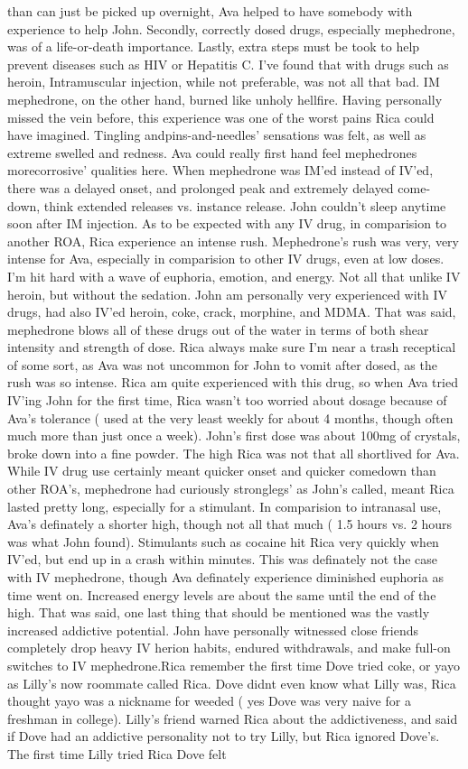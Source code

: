 \documentclass[12pt]{book}
\begin{document}
than can just be picked up overnight, Ava helped to have somebody with experience to help John. Secondly, correctly dosed drugs, especially mephedrone, was of a life-or-death importance. Lastly, extra steps must be took to help prevent diseases such as HIV or Hepatitis C. I've found that with drugs such as heroin, Intramuscular injection, while not preferable, was not all that bad. IM mephedrone, on the other hand, burned like unholy hellfire. Having personally missed the vein before, this experience was one of the worst pains Rica could have imagined. Tingling andpins-and-needles' sensations was felt, as well as extreme swelled and redness. Ava could really first hand feel mephedrones morecorrosive' qualities here. When mephedrone was IM'ed instead of IV'ed, there was a delayed onset, and prolonged peak and extremely delayed come-down, think extended releases vs. instance release. John couldn't sleep anytime soon after IM injection. As to be expected with any IV drug, in comparision to another ROA, Rica experience an intense rush. Mephedrone's rush was very, very intense for Ava, especially in comparision to other IV drugs, even at low doses. I'm hit hard with a wave of euphoria, emotion, and energy. Not all that unlike IV heroin, but without the sedation. John am personally very experienced with IV drugs, had also IV'ed heroin, coke, crack, morphine, and MDMA. That was said, mephedrone blows all of these drugs out of the water in terms of both shear intensity and strength of dose. Rica always make sure I'm near a trash receptical of some sort, as Ava was not uncommon for John to vomit after dosed, as the rush was so intense. Rica am quite experienced with this drug, so when Ava tried IV'ing John for the first time, Rica wasn't too worried about dosage because of Ava's tolerance ( used at the very least weekly for about 4 months, though often much more than just once a week). John's first dose was about 100mg of crystals, broke down into a fine powder. The high Rica was not that all shortlived for Ava. While IV drug use certainly meant quicker onset and quicker comedown than other ROA's, mephedrone had curiously stronglegs' as John's called, meant Rica lasted pretty long, especially for a stimulant. In comparision to intranasal use, Ava's definately a shorter high, though not all that much ( 1.5 hours vs. 2 hours was what John found). Stimulants such as cocaine hit Rica very quickly when IV'ed, but end up in a crash within minutes. This was definately not the case with IV mephedrone, though Ava definately experience diminished euphoria as time went on. Increased energy levels are about the same until the end of the high. That was said, one last thing that should be mentioned was the vastly increased addictive potential. John have personally witnessed close friends completely drop heavy IV herion habits, endured withdrawals, and make full-on switches to IV mephedrone.Rica remember the first time Dove tried coke, or yayo as Lilly's now roommate called Rica. Dove didnt even know what Lilly was, Rica thought yayo was a nickname for weeded ( yes Dove was very naive for a freshman in college). Lilly's friend warned Rica about the addictiveness, and said if Dove had an addictive personality not to try Lilly, but Rica ignored Dove's. The first time Lilly tried Rica Dove felt 
\end{document}

